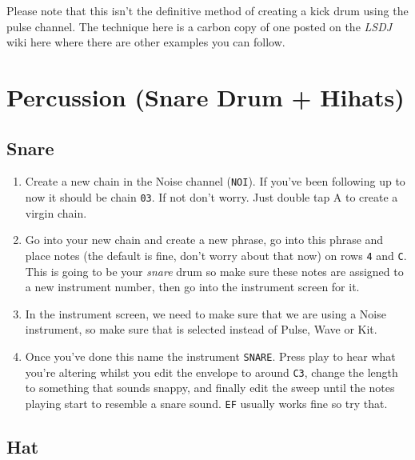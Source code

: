 \documentclass[]{article}
\newcommand{\buttonStyle}[1]{\textsf{#1}\xspace}
\newcommand{\bA}{\buttonStyle{A}}
\newcommand{\gbtxt}[1]{\texttt{#1}\xspace}
\newcommand{\lsdj}{\textit{LSDJ}\xspace}
\begin{document}
Please note that this isn't the definitive method of creating a kick drum using the pulse channel. The technique here is a carbon copy of one posted on the \lsdj wiki here where there are other examples you can follow.


\section{Percussion (Snare Drum + Hihats)}

\subsection{Snare}

\begin{enumerate}


\item Create a new chain in the Noise channel (\gbtxt{NOI}). If you've been following up to now it should be chain \gbtxt{03}. If not don't worry. Just double tap \bA to create a virgin chain.

\item Go into your new chain and create a new phrase, go into this phrase and place notes (the default is fine, don't worry about that now) on rows \gbtxt{4} and \gbtxt{C}. This is going to be your \textit{snare} drum so make sure these notes are assigned to a new instrument number, then go into the instrument screen for it.

\item In the instrument screen, we need to make sure that we are using a Noise instrument, so make sure that is selected instead of Pulse, Wave or Kit.

\item Once you've done this name the instrument \gbtxt{SNARE}. Press play to hear what you're altering whilst you edit the envelope to around \gbtxt{C3}, change the length to something that sounds snappy, and finally edit the sweep until the notes playing start to resemble a snare sound. \gbtxt{EF} usually works fine so try that.

\end{enumerate}

\subsection{Hat}
\end{document}
